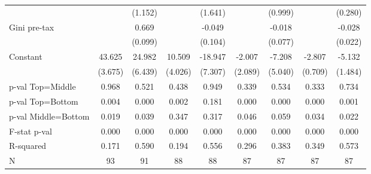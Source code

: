 \begin{tabular}{l*{8}{c}}
                    &            &     (1.152)&            &     (1.641)&            &     (0.999)&            &     (0.280)\\
\addlinespace
Gini pre-tax        &            &       0.669&            &      -0.049&            &      -0.018&            &      -0.028\\
                    &            &     (0.099)&            &     (0.104)&            &     (0.077)&            &     (0.022)\\
\addlinespace
Constant            &      43.625&      24.982&      10.509&     -18.947&      -2.007&      -7.208&      -2.807&      -5.132\\
                    &     (3.675)&     (6.439)&     (4.026)&     (7.307)&     (2.089)&     (5.040)&     (0.709)&     (1.484)\\
\midrule
p-val Top=Middle    &       0.968&       0.521&       0.438&       0.949&       0.339&       0.534&       0.333&       0.734\\
p-val Top=Bottom    &       0.004&       0.000&       0.002&       0.181&       0.000&       0.000&       0.000&       0.001\\
p-val Middle=Bottom &       0.019&       0.039&       0.347&       0.317&       0.046&       0.059&       0.034&       0.022\\
F-stat p-val        &       0.000&       0.000&       0.000&       0.000&       0.000&       0.000&       0.000&       0.000\\
R-squared           &       0.171&       0.590&       0.194&       0.556&       0.296&       0.383&       0.349&       0.573\\
N                   &          93&          91&          88&          88&          87&          87&          87&          87\\
\bottomrule
\end{tabular}
